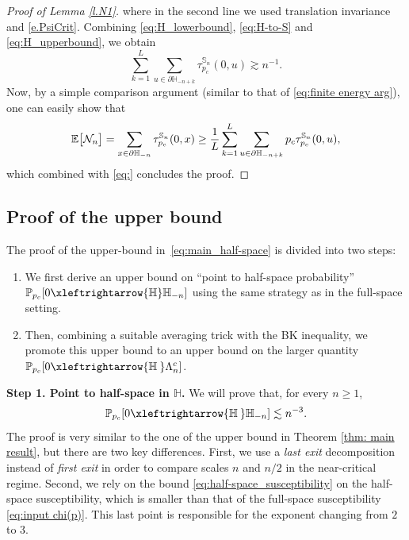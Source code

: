 \documentclass[11pt,a4paper]{article}
\numberwithin{equation}{section}
\theoremstyle{plain}
\theoremstyle{definition}
\newcommand{\connect}{\xleftrightarrow}
\newcommand{\1}{\mathbf 1}
\def\H{\mathbb{H}}
\def\P{\mathbb{P}} %
\def\E{\mathbb{E}} %
\def\md{\mid}
\def\Bb#1#2{{\def\md{\bigm| }#1\bigl[#2\bigr]}}
\def\Eb{\Bb\E}
\def\bnum{\begin{enumerate}} %
\def\enum{\end{enumerate}}
\def\bf{\bfseries}
\begin{document}
\begin{proof}[Proof of Lemma \textup{\ref{l.N1}}]
	where in the second line we used translation invariance and \eqref{e.PsiCrit}. 
	Combining \eqref{eq:H_lowerbound}, \eqref{eq:H-to-S} and \eqref{eq:H_upperbound}, we obtain
	\begin{equation}\label{eq:}
		\sum_{k=1}^L \sum_{u\in \partial \H_{-n+k}} \tau_{p_c}^{\mathbb{S}_n}(0,u) \gtrsim n^{-1}.
	\end{equation}
	Now, by a simple comparison argument (similar to that of \eqref{eq:finite energy arg}), one can easily show that
	\begin{equation}
		\Eb{\mathcal N_n}=\sum_{x\in \partial \H_{-n}} \tau_{p_c}^{\mathbb{S}_n}(0,x) \geq \frac{1}{L}\sum_{k=1}^L \sum_{u\in \partial \H_{-n+k}} p_c\tau_{p_c}^{\mathbb{S}_n}(0,u),
	\end{equation}
	which combined with \eqref{eq:} concludes the proof.
\end{proof}



\subsection{Proof of the upper bound}


The proof of the upper-bound in~\eqref{eq:main_half-space} is divided into two steps:
\bnum
\item We first derive an upper bound on ``point to half-space probability'' $\P_{p_c}[0\connect{\mathbb H} \H_{-n}]$ using the same strategy as in the full-space setting.
\item Then, combining a suitable averaging trick with the BK inequality, we promote this upper bound to an upper bound on the larger quantity $\P_{p_c}[0\connect{\mathbb H\:} \Lambda_{n}^c]$. 
\enum




\noindent
\textbf{Step 1. Point to half-space in $\H$.} We will prove that, for every $n\geq 1$,
\begin{equation}\label{eq:pt-to-half-space_ub}
	\P_{p_c}[0\connect{\mathbb H\:} \H_{-n}] \lesssim n^{-3}.
\end{equation}
The proof is very similar to the one of the upper bound in Theorem \ref{thm: main result}, but there are two key differences. First, we use a \emph{last exit} decomposition instead of \emph{first exit} in order to compare scales $n$ and $n/2$ in the near-critical regime. Second, we rely on the bound \eqref{eq:half-space_susceptibility} on the half-space susceptibility, which is smaller than that of the full-space susceptibility \eqref{eq:input chi(p)}. This last point is responsible for the exponent changing from $2$ to $3$. 
\end{document}
